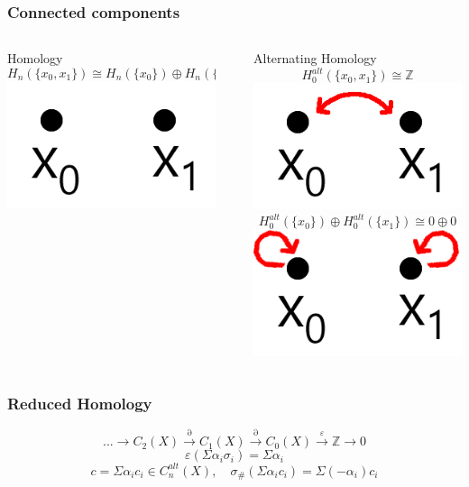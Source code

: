 \documentclass{beamer}[10pt]
\theoremstyle{definition}
\begin{document}
\begin{frame}
\frametitle{Connected components}
\begin{columns}[T] %
\begin{column}{.47\textwidth}
\centering
Homology
\small$$H_n(\{x_0,x_1\})\cong H_n(\{x_0\})\oplus H_n(\{x_1\})$$
\vspace{1cm}
\includegraphics[scale=0.15]{twopoints.png}
\end{column}%
\begin{column}{.03\textwidth}
\centering
\rule[-1mm]{0.5mm}{6cm}%
\end{column}%
\begin{column}{.47\textwidth}
\centering
Alternating Homology
$$H^{alt}_0(\{x_0,x_1\})\cong \mathbb{Z}$$
\includegraphics[scale=0.15]{twopointsPermuted.png}
$$H^{alt}_0(\{x_0\})\oplus H^{alt}_0(\{x_1\})\cong0\oplus0$$
\includegraphics[scale=0.15]{twopointsSplit.png}
\end{column}%
\end{columns}
\end{frame}


\begin{frame}
\frametitle{Reduced Homology}
$$...\longrightarrow C_2(X)\overset\partial\longrightarrow C_1(X) \overset\partial\longrightarrow C_0(X)\overset\varepsilon\longrightarrow \mathbb{Z}\longrightarrow 0$$
$$\varepsilon(\Sigma\alpha_i\sigma_i)=\Sigma\alpha_i $$
\vspace{12mm}
$$c=\Sigma\alpha_ic_i\in C^{alt}_n(X),\quad\sigma_\#(\Sigma\alpha_ic_i)=\Sigma(-\alpha_i)c_i$$
\end{frame}
\end{document}

